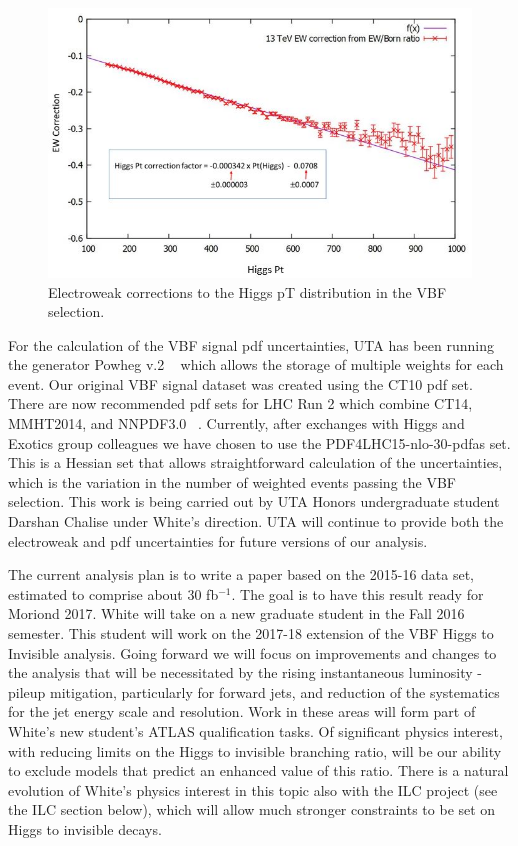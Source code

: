 \begin{figure}[htb]
\centering
      \includegraphics[scale=0.5]{images/HAWK_EW_corrections.JPG}
\caption{Electroweak corrections to the Higgs pT distribution in the VBF selection.}\label{fig:HAWK_EW}
\end{figure}

For the calculation of the VBF signal pdf uncertainties, UTA has been running the generator Powheg v.2 ~\cite{Powheg} which allows the storage of
multiple weights for each event. Our original VBF signal dataset was created using the CT10 pdf set. There are now recommended pdf 
sets for LHC Run 2 which combine CT14, MMHT2014, and NNPDF3.0 ~\cite{Run2PDF}. Currently, after exchanges with Higgs and Exotics group colleagues 
we have chosen to use the PDF4LHC15-nlo-30-pdfas set. This is a Hessian set that allows straightforward calculation of the 
uncertainties, which is the variation in the number of weighted events passing the VBF selection. This work is being carried out 
by UTA Honors undergraduate student Darshan Chalise under White's direction. UTA will continue to provide both the electroweak and 
pdf uncertainties for future versions of our analysis.
  
The current analysis plan is to write a paper based on the 2015-16 data set, estimated to comprise about 30 fb$^{-1}$. The goal is to have 
this result ready for Moriond 2017. White will take on a new graduate student in the Fall 2016 semester. This student will work on the
2017-18 extension of the VBF Higgs to Invisible analysis. Going forward we will focus on improvements and changes to the analysis that
will be necessitated by the rising instantaneous luminosity - pileup mitigation, particularly for forward jets, and reduction of the
systematics for the jet energy scale and resolution. Work in these areas will form part of White's new student's ATLAS qualification 
tasks. Of significant physics interest, with reducing limits on the Higgs to invisible branching ratio, will be our ability to exclude 
models that predict an enhanced value of this ratio. There is a natural evolution of White's physics interest in this topic also with the ILC project (see the ILC
 section below), which will allow much stronger constraints to be set on Higgs to invisible decays.

